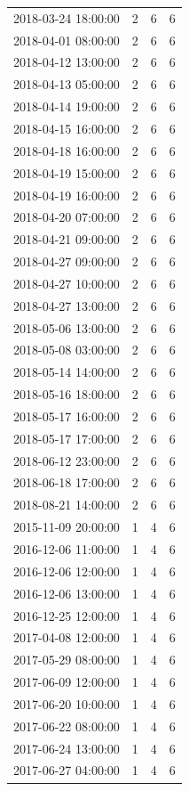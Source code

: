 \begin{tabular}{lrrr}
2018-03-24 18:00:00 & 2 & 6 & 6 \\
2018-04-01 08:00:00 & 2 & 6 & 6 \\
2018-04-12 13:00:00 & 2 & 6 & 6 \\
2018-04-13 05:00:00 & 2 & 6 & 6 \\
2018-04-14 19:00:00 & 2 & 6 & 6 \\
2018-04-15 16:00:00 & 2 & 6 & 6 \\
2018-04-18 16:00:00 & 2 & 6 & 6 \\
2018-04-19 15:00:00 & 2 & 6 & 6 \\
2018-04-19 16:00:00 & 2 & 6 & 6 \\
2018-04-20 07:00:00 & 2 & 6 & 6 \\
2018-04-21 09:00:00 & 2 & 6 & 6 \\
2018-04-27 09:00:00 & 2 & 6 & 6 \\
2018-04-27 10:00:00 & 2 & 6 & 6 \\
2018-04-27 13:00:00 & 2 & 6 & 6 \\
2018-05-06 13:00:00 & 2 & 6 & 6 \\
2018-05-08 03:00:00 & 2 & 6 & 6 \\
2018-05-14 14:00:00 & 2 & 6 & 6 \\
2018-05-16 18:00:00 & 2 & 6 & 6 \\
2018-05-17 16:00:00 & 2 & 6 & 6 \\
2018-05-17 17:00:00 & 2 & 6 & 6 \\
2018-06-12 23:00:00 & 2 & 6 & 6 \\
2018-06-18 17:00:00 & 2 & 6 & 6 \\
2018-08-21 14:00:00 & 2 & 6 & 6 \\
2015-11-09 20:00:00 & 1 & 4 & 6 \\
2016-12-06 11:00:00 & 1 & 4 & 6 \\
2016-12-06 12:00:00 & 1 & 4 & 6 \\
2016-12-06 13:00:00 & 1 & 4 & 6 \\
2016-12-25 12:00:00 & 1 & 4 & 6 \\
2017-04-08 12:00:00 & 1 & 4 & 6 \\
2017-05-29 08:00:00 & 1 & 4 & 6 \\
2017-06-09 12:00:00 & 1 & 4 & 6 \\
2017-06-20 10:00:00 & 1 & 4 & 6 \\
2017-06-22 08:00:00 & 1 & 4 & 6 \\
2017-06-24 13:00:00 & 1 & 4 & 6 \\
2017-06-27 04:00:00 & 1 & 4 & 6 \\

\end{tabular}
